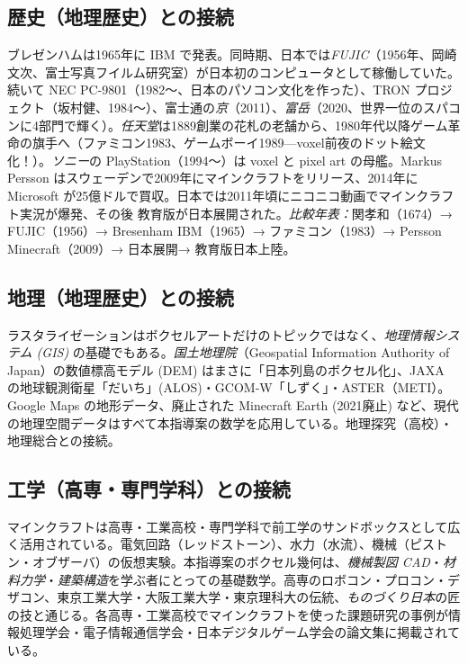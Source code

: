 \documentclass[12pt,a4paper]{scrartcl}
\begin{document}
\subsection{歴史（地理歴史）との接続}
ブレゼンハムは1965年に IBM で発表。同時期、日本では\emph{FUJIC}（1956年、岡崎文次、富士写真フイルム研究室）が日本初のコンピュータとして稼働していた。続いて NEC PC-9801（1982〜、日本のパソコン文化を作った）、TRON プロジェクト（坂村健、1984〜）、富士通の\emph{京}（2011）、\emph{富岳}（2020、世界一位のスパコンに4部門で輝く）。\emph{任天堂}は1889創業の花札の老舗から、1980年代以降ゲーム革命の旗手へ（ファミコン1983、ゲームボーイ1989---voxel前夜のドット絵文化！）。\emph{ソニー}の PlayStation（1994〜）は voxel と pixel art の母艦。Markus Persson はスウェーデンで2009年にマインクラフトをリリース、2014年に Microsoft が25億ドルで買収。日本では2011年頃にニコニコ動画でマインクラフト実況が爆発、その後 教育版が日本展開された。\emph{比較年表：}関孝和（1674）→ FUJIC（1956）→ Bresenham IBM（1965）→ ファミコン（1983）→ Persson Minecraft（2009）→ 日本展開→ 教育版日本上陸。

\subsection{地理（地理歴史）との接続}
ラスタライゼーションはボクセルアートだけのトピックではなく、\emph{地理情報システム (GIS)} の基礎でもある。\emph{国土地理院}（Geospatial Information Authority of Japan）の数値標高モデル (DEM) はまさに「日本列島のボクセル化」、JAXA の地球観測衛星「だいち」(ALOS)・GCOM-W「しずく」・ASTER（METI）。Google Maps の地形データ、廃止された Minecraft Earth (2021廃止) など、現代の地理空間データはすべて本指導案の数学を応用している。地理探究（高校）・地理総合との接続。

\subsection{工学（高専・専門学科）との接続}
マインクラフトは高専・工業高校・専門学科で前工学のサンドボックスとして広く活用されている。電気回路（レッドストーン）、水力（水流）、機械（ピストン・オブザーバ）の仮想実験。本指導案のボクセル幾何は、\emph{機械製図 CAD}・\emph{材料力学}・\emph{建築構造}を学ぶ者にとっての基礎数学。高専のロボコン・プロコン・デザコン、東京工業大学・大阪工業大学・東京理科大の伝統、\emph{ものづくり日本}の匠の技と通じる。各高専・工業高校でマインクラフトを使った課題研究の事例が情報処理学会・電子情報通信学会・日本デジタルゲーム学会の論文集に掲載されている。

\end{document}
